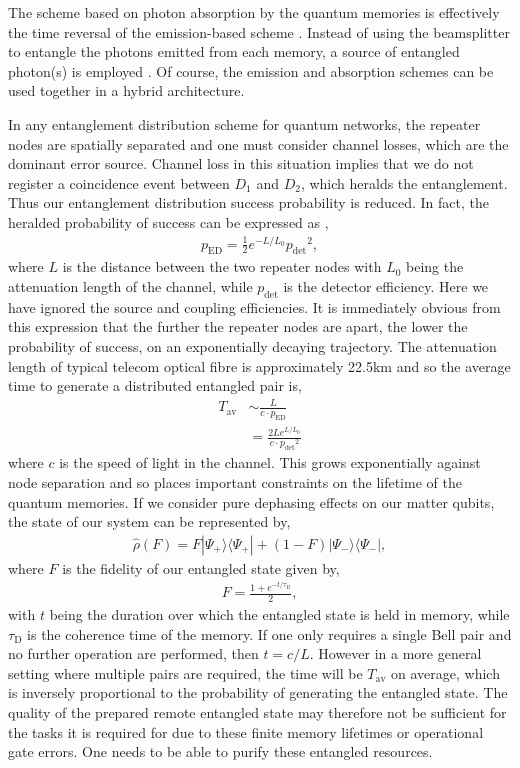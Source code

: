 \documentclass[twocolumn, aps, rmp, amsmath, amssymb, nofootinbib, superscriptaddress, longbibliography, floatfix, table-of-contents, eqsecnum]{revtex4-1}
\begin{document}
The scheme based on photon absorption by the quantum memories is effectively the time reversal of the emission-based scheme \cite{}. Instead of using the beamsplitter to entangle the photons emitted from each memory, a source of entangled photon(s) is employed \cite{}. Of course, the emission and absorption schemes can be used together in a hybrid architecture.

In any entanglement distribution scheme for quantum networks, the repeater nodes are spatially separated and one must consider channel losses, which are the dominant error source. Channel loss in this situation implies that we do not register a coincidence event between $D_1$ and $D_2$, which heralds the entanglement. Thus our entanglement distribution success probability is reduced. In fact, the heralded probability of success can be expressed as \cite{},
\begin{align}
p_\mathrm{ED}= \frac{1}{2} e^{-L/L_0} {p_\mathrm{det}}^2,
\end{align} 
where $L$ is the distance between the two repeater nodes with $L_0$ being the attenuation length of the channel, while $p_\mathrm{det}$ is the detector efficiency. Here we have ignored the source and coupling efficiencies. It is immediately obvious from this expression that the further the repeater nodes are apart, the lower the probability of success, on an exponentially decaying trajectory. The attenuation length of typical telecom optical fibre is approximately 22.5km and so the average time to generate a distributed entangled pair is,
\begin{align}
T_\mathrm{av} &\sim \frac{L}{ c \cdot p_\mathrm{ED}}\nonumber\\
&= \frac{2 L e^{L/L_0}}{ c \cdot {p_\mathrm{det}}^2}
\end{align} 
where $c$ is the speed of light in the channel. This grows exponentially against node separation and so places important constraints on the lifetime of the quantum memories. If we consider pure dephasing effects on our matter qubits, the state of our system can be represented by,
\begin{align}
\hat\rho(F) = F |\Psi_+\rangle \langle \Psi_+|+(1-F) |\Psi_-\rangle \langle \Psi_-|,
\label{eq:rho_bell_fid}
\end{align} 
where $F$ is the fidelity of our entangled state given by,
\begin{align}
F=\frac{1+e^{-t/\tau_\mathrm{D}}}{2},
\end{align} 
with $t$ being the duration over which the entangled state is held in memory, while $\tau_\mathrm{D}$ is the coherence time of the memory. If one only requires a single Bell pair and no further operation are performed, then \mbox{$t=c/L$}. However in a more general setting where multiple pairs are required, the time will be $T_\mathrm{av}$ on average, which is inversely proportional to the probability of generating the entangled state. The quality of the prepared remote entangled state may therefore not be sufficient for the tasks it is required for due to these finite memory lifetimes or operational gate errors. One needs to be able to purify these entangled resources. 
\end{document}
